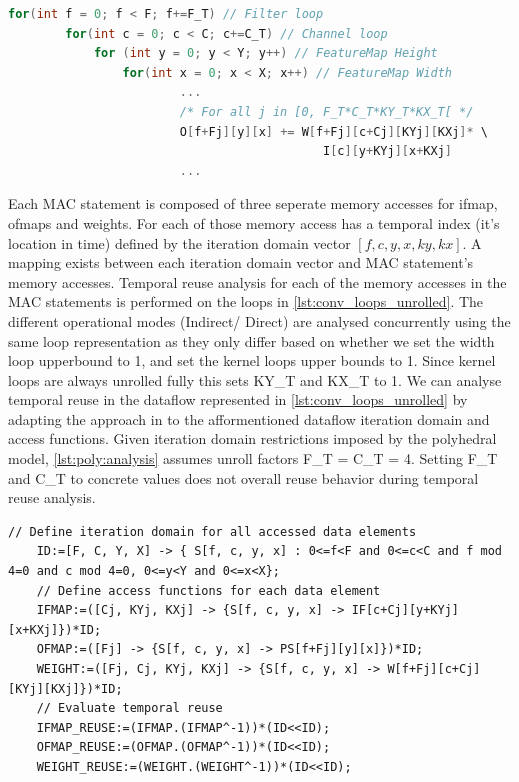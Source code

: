 \clearpage 

\begin{lstlisting}[language=C, caption=Fully unrolled convolution dataflow loops, label={lst:conv_loops_unrolled}]
    for(int f = 0; f < F; f+=F_T) // Filter loop
        for(int c = 0; c < C; c+=C_T) // Channel loop
            for (int y = 0; y < Y; y++) // FeatureMap Height
                for(int x = 0; x < X; x++) // FeatureMap Width
                        ...
                        /* For all j in [0, F_T*C_T*KY_T*KX_T[ */ 
                        O[f+Fj][y][x] += W[f+Fj][c+Cj][KYj][KXj]* \
                                            I[c][y+KYj][x+KXj] 
                        ...
\end{lstlisting}

Each MAC statement is composed of three seperate memory accesses for ifmap,
ofmaps and weights. For each of those memory access has a temporal index (it's location in time) defined by the
iteration domain vector $[f, c, y, x, ky, kx]$. A mapping exists between each
iteration domain vector and MAC statement's memory accesses.  
Temporal reuse analysis for each of the memory accesses in the MAC statements is performed on the loops in \autoref{lst:conv_loops_unrolled}. The different
operational modes (Indirect/ Direct) are analysed concurrently using the same loop
representation as they only differ based on whether we set the width loop
upperbound to 1, and set the kernel loops upper bounds to 1. Since
kernel loops are always unrolled fully this sets KY\_T and KX\_T to 1. We can
analyse temporal reuse in the dataflow represented in
\autoref{lst:conv_loops_unrolled} by adapting the approach in \cite{meeus} 
to the afformentioned dataflow iteration domain and access functions.
Given iteration domain restrictions imposed by the polyhedral model,
\autoref{lst:poly:analysis} assumes unroll factors F\_T =
C\_T = 4. Setting F\_T and C\_T to concrete values does not overall reuse behavior during temporal reuse analysis.

\clearpage
\begin{lstlisting}[caption=Polyhedral analysis of reuse in iscc for convolution loops, label={lst:poly:analysis}]
    // Define iteration domain for all accessed data elements
    ID:=[F, C, Y, X] -> { S[f, c, y, x] : 0<=f<F and 0<=c<C and f mod 4=0 and c mod 4=0, 0<=y<Y and 0<=x<X};
    // Define access functions for each data element
    IFMAP:=([Cj, KYj, KXj] -> {S[f, c, y, x] -> IF[c+Cj][y+KYj][x+KXj]})*ID;
    OFMAP:=([Fj] -> {S[f, c, y, x] -> PS[f+Fj][y][x]})*ID;
    WEIGHT:=([Fj, Cj, KYj, KXj] -> {S[f, c, y, x] -> W[f+Fj][c+Cj][KYj][KXj]})*ID;
    // Evaluate temporal reuse
    IFMAP_REUSE:=(IFMAP.(IFMAP^-1))*(ID<<ID);
    OFMAP_REUSE:=(OFMAP.(OFMAP^-1))*(ID<<ID);
    WEIGHT_REUSE:=(WEIGHT.(WEIGHT^-1))*(ID<<ID);  

\end{lstlisting}

